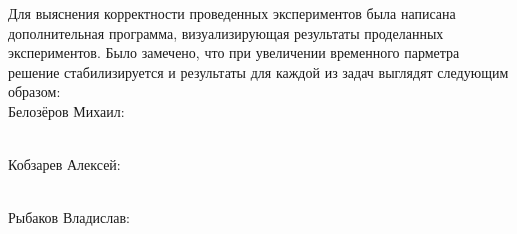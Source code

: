 \documentclass[a4paper, 25pt]{article}
\begin{document}
Для выяснения корректности проведенных экспериментов была написана дополнительная программа, визуализирующая результаты проделанных экспериментов. Было замечено, что при увеличении временного парметра решение стабилизируется и результаты для каждой из задач выглядят следующим образом: \\
Белозёров Михаил:
\begin{figure}[h!]
\end{figure}
\\
\newpage
Кобзарев Алексей:
\begin{figure}[h!]
\end{figure}
\\
Рыбаков Владислав:
\begin{figure}[h!]
\end{figure}
\end{document}
